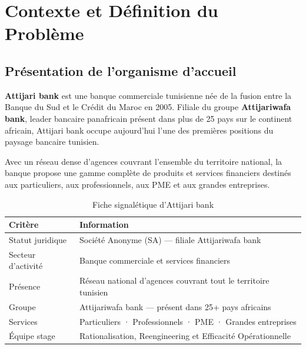 \documentclass[12pt,a4paper]{report}
\begin{document}
\tableofcontents
\thispagestyle{empty}
\newpage


\chapter{Contexte et Définition du Problème}

\section{Présentation de l'organisme d'accueil}

\textbf{Attijari bank} est une banque commerciale tunisienne née de la fusion entre la Banque du Sud et le Crédit du Maroc en 2005. Filiale du groupe \textbf{Attijariwafa bank}, leader bancaire panafricain présent dans plus de 25 pays sur le continent africain, Attijari bank occupe aujourd'hui l'une des premières positions du paysage bancaire tunisien.

Avec un réseau dense d'agences couvrant l'ensemble du territoire national, la banque propose une gamme complète de produits et services financiers destinés aux particuliers, aux professionnels, aux PME et aux grandes entreprises.

\begin{table}[H]
\centering
\caption{Fiche signalétique d'Attijari bank}
\begin{tabularx}{\textwidth}{|l|X|}
\hline
\textbf{Critère} & \textbf{Information} \\
\hline
Statut juridique & Société Anonyme (SA) --- filiale Attijariwafa bank \\
\hline
Secteur d'activité & Banque commerciale et services financiers \\
\hline
Présence & Réseau national d'agences couvrant tout le territoire tunisien \\
\hline
Groupe & Attijariwafa bank --- présent dans 25+ pays africains \\
\hline
Services & Particuliers · Professionnels · PME · Grandes entreprises \\
\hline
Équipe stage & Rationalisation, Reengineering et Efficacité Opérationnelle \\
\hline
\end{tabularx}
\end{table}
\end{document}
